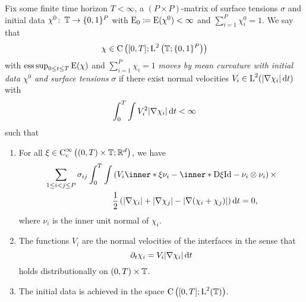 \begin{definition}
	\label{motion_by_mmcf}
	Fix some finite time horizon $ T < \infty $, a $ ( P \times P ) $-matrix of 
	surface tensions $ \sigma $ and initial data $ \chi^{ 0 } \colon \operatorname{\mathbb{T}} 
	\to \{ 0 , 1 \}^{ P } $ with $ \operatorname{E}_{ 0 } \coloneqq \operatorname{E} ( \chi^{ 0 } 
	) < \infty $ and 
	$ \sum_{ i = 1 }^{ P } \chi_{ i }^{ 0 } = 1 $. We say that
	\begin{equation*}
		\chi \in \operatorname{C} \left(
		[ 0 , T ]
		;
		\operatorname{L}^{ 2 } \left( \operatorname{\mathbb{T}} ; \{ 0 , 1 \}^{ P } \right)
		\right)
	\end{equation*}
	with $ \operatorname*{ess\,sup}_{ 0 \leq t \leq T } \operatorname{E} ( \chi ) $ and $ \sum_{ i = 1 
	}^{ P } \chi_{ i } = 1 $ \emph{moves by mean curvature with initial data} $ 
	\chi^{ 0 } $ \emph{and surface tensions} $ \sigma $ if there exist normal 
	velocities $ V_{ i } \in \operatorname{L}^{ 2 } ( \abs{ \nabla \chi_{ i } } \dd{ t } ) $ 
	with
	\begin{equation*}
		\int_{ 0 }^{ T }
		\int
		V_{ i }^{ 2 }
		\abs{ \nabla \chi_{ i } }
		\dd{ t }
		< \infty 
	\end{equation*} 
	such that
	\begin{enumerate}
		\item For all 
		$ \xi \in \operatorname{C}_{ \mathrm{c} }^{ \infty } \left(
		( 0 , T ) \times \operatorname{\mathbb{T}} ; \mathbb{ R }^{ d }
		\right)
		$, we have 
		\begin{align}
			\label{distributional_equation_mmcf}
			\sum_{ 1 \leq i < j \leq P }
			\sigma_{ i j }
			\int_{ 0 }^{ T }
			\int
			&
			\left(
			V_{ i } \inner*{ \xi }{ \nu_{ i } }
			-
			\inner*{ \diff \xi }{ \mathrm{Id} - \nu_{ i } \otimes \nu_{ i } }
			\right)
			\times
			\\
			\notag
			& \frac{1}{ 2 }
			\left(
			\abs{ \nabla \chi_{ i } }
			+
			\abs{ \nabla \chi_{ j } }
			-
			\abs{ \nabla ( \chi_{ i } + \chi_{ j } ) }
			\right)
			\dd{ t }
			=0,			
		\end{align}
		where $ \nu_{ i } $ is the inner unit normal of $ \chi_{ i } $.
		
		\item 
		The functions $ V_{ i } $ are the normal velocities of the interfaces 
		in the sense that
		\begin{equation*}
			\partial_{ t } \chi_{ i }
			=
			V_{ i } \abs{ \nabla \chi_{ i } } \dd{ t }
		\end{equation*}
		holds distributionally on $ ( 0 , T ) \times \operatorname{\mathbb{T}} $.
		
		\item
		The initial data is achieved in the space $ \operatorname{C} \left( [ 0 , T ] ; 
		\operatorname{L}^{ 2 } ( \operatorname{\mathbb{T}} ) \right) $.
	\end{enumerate}
\end{definition}

